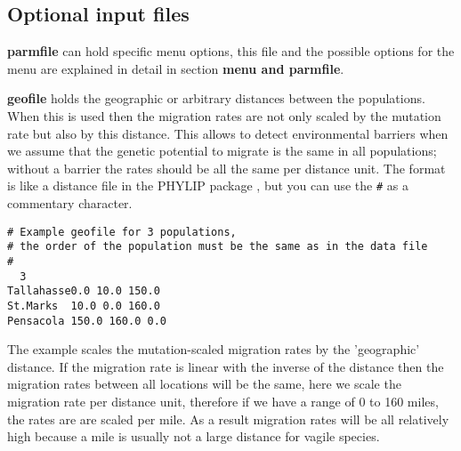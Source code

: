 \subsection{Optional input files}
\begin{description}
\item{\textbf{parmfile}} can hold specific menu options, this file and the possible options for the menu are explained in detail in section \textbf{menu and parmfile}.
\item{\textbf{geofile}} holds the geographic or arbitrary distances between the populations. When this is used then the migration rates are not only scaled by the mutation rate but also by this distance. This allows to detect environmental barriers when we assume that the genetic potential to migrate is the same in all populations; without a barrier the rates should be all the same per distance unit. The format is like a distance file in the PHYLIP package \citep{felsenstein:2005}, but you can use the \texttt{\#} as a commentary character.\\
\begin{small}
\begin{verbatim}
# Example geofile for 3 populations, 
# the order of the population must be the same as in the data file
# 
  3
Tallahasse0.0 10.0 150.0
St.Marks  10.0 0.0 160.0
Pensacola 150.0 160.0 0.0
\end{verbatim}
\end{small}
The example scales the mutation-scaled migration rates by the 'geographic' distance. If the migration rate is linear with the inverse of the distance then the migration rates between all locations will be the same, here we scale the migration rate per distance unit, therefore if we have a range of 0 to 160 miles, the rates are are scaled per mile. As a result migration rates will be all relatively high because a mile is usually not a large distance for vagile species. 


\end{description}
